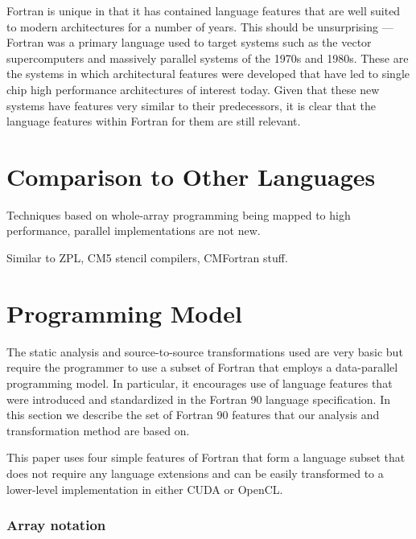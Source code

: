 \documentclass[10pt, conference, compsocconf]{IEEEtran}
\begin{document}
Fortran is unique in that it has contained language features that are
well suited to modern architectures for a number of years.  This
should be unsurprising --- Fortran was a primary language used to
target systems such as the vector supercomputers and massively
parallel systems of the 1970s and 1980s.  These are the systems in
which architectural features were developed that have led to single
chip high performance architectures of interest today.  Given that
these new systems have features very similar to their predecessors, it
is clear that the language features within Fortran for them are still
relevant.

\section{Comparison to Other Languages}



Techniques based on whole-array programming being mapped to high performance,
parallel implementations are not new.  

Similar to ZPL, CM5 stencil compilers, CMFortran stuff.



\section{Programming Model}

The static analysis and source-to-source transformations used are very
basic but require the programmer to use a subset of Fortran
that employs a data-parallel programming model.  In particular, it
encourages use of language features that were introduced and
standardized in the Fortran 90 language specification.  In this
section we describe the set of Fortran 90 features that our analysis
and transformation method are based on.

This paper uses four simple features of Fortran that form a language subset
that does not require any language extensions and can be easily transformed
to a lower-level implementation in either CUDA or OpenCL.

\subsubsection*{Array notation}
\end{document}
